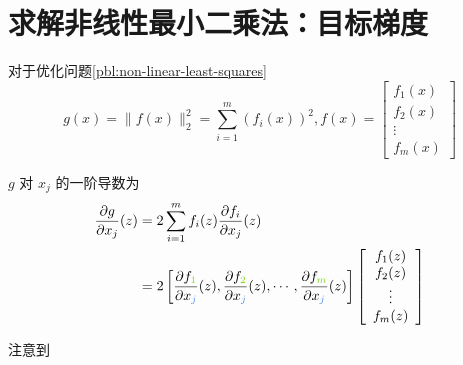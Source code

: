 \section{求解非线性最小二乘法：目标梯度}

对于优化问题\ref{pbl:non-linear-least-squares}
\begin{equation} g(x)=\|f(x)\|_{2}^{2}=\sum_{i=1}^{m}\left(f_{i}(x)\right)^{2},f(x)=\left[\begin{array}{c}f_{1}(x) \\ f_{2}(x) \\ \vdots \\ f_{m}(x)\end{array}\right] \end{equation}

$ g $ 对 $ x_{j} $ 的一阶导数为
\begin{equation}\begin{aligned}
    \frac{\partial g}{\partial x_{j}} (z) & =2\sum _{i=1}^{m} f_{i} (z)\frac{\partial f_{i}}{\partial x_{j}} (z)\\
     & =2\left[\frac{\partial f_{\textcolor[rgb]{0.49,0.83,0.13}{1}}}{\partial x_{\textcolor[rgb]{0.29,0.56,0.89}{j}}} (z),\frac{\partial f_{\textcolor[rgb]{0.49,0.83,0.13}{2}}}{\partial x_{\textcolor[rgb]{0.29,0.56,0.89}{j}}} (z),\cdots ,\frac{\partial f_{\textcolor[rgb]{0.49,0.83,0.13}{m}}}{\partial x_{\textcolor[rgb]{0.29,0.56,0.89}{j}}} (z)\right]\left[\begin{array}{ c }
    f_{1} (z)\\
    f_{2} (z)\\
    \vdots \\
    f_{m} (z)
    \end{array}\right]
    \end{aligned}\end{equation}

注意到

